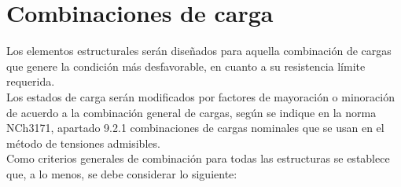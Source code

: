 \newpage
\section {Combinaciones de carga}

Los elementos estructurales serán diseñados para aquella combinación de cargas que genere la condición más desfavorable, en cuanto a su resistencia límite requerida. \\

Los estados de carga serán modificados por factores de mayoración o minoración de acuerdo a la combinación general de cargas, según se indique en la norma NCh3171, apartado 9.2.1 combinaciones de cargas nominales que se usan en el método de tensiones admisibles. \\

Como criterios generales de combinación para todas las estructuras se establece que, a lo menos, se debe considerar lo siguiente: \\ %

